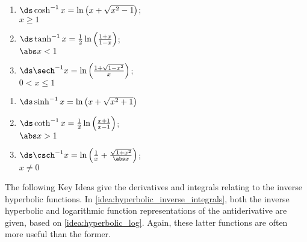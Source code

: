 \setboxwidth{30pt}
{\noindent%
\begin{minipage}[t]{.5\specialboxlength}
\begin{enumerate}
\item $\ds\cosh^{-1}x=\ln\big(x+\sqrt{x^2-1}\big)$;\\\null\qquad $x\geq1$
\item $\ds\tanh^{-1}x=\frac12\ln\left(\frac{1+x}{1-x}\right)$;\\\null\qquad$\abs x<1$
\item $\ds\sech^{-1}x=\ln\left(\frac{1+\sqrt{1-x^2}}x\right)$;\\\null\qquad$0<x\leq1$
\end{enumerate}
\end{minipage}%
\begin{minipage}[t]{.5\specialboxlength}
\begin{enumerate}\addtocounter{enumi}{3}
\item $\ds\sinh^{-1}x=\ln\big(x+\sqrt{x^2+1}\big)$\\\mbox{}
\item $\ds\coth^{-1}x=\frac12\ln\left(\frac{x+1}{x-1}\right)$;\\\null\qquad$\abs x>1$
\item $\ds\csch^{-1}x=\ln\left(\frac1x+\frac{\sqrt{1+x^2}}{\abs x}\right)$;\\\null\qquad $x\neq0$
\end{enumerate}
\end{minipage}}

The following Key Ideas give the derivatives and integrals relating to the inverse hyperbolic functions. In \autoref{idea:hyperbolic_inverse_integrals}, both the inverse hyperbolic and logarithmic function representations of the antiderivative are given, based on \autoref{idea:hyperbolic_log}. Again, these latter functions are often more useful than the former.




